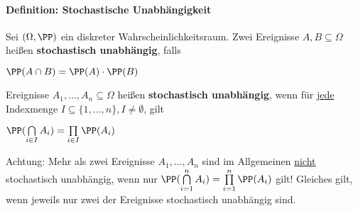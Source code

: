 \paragraph{Definition: Stochastische Unabhängigkeit}\label{independant}
Sei $(\Omega,\PP)$ ein diskreter Wahrscheinlichkeitsraum. 
Zwei Ereignisse $A,B\subseteq\Omega$ heißen \textbf{stochastisch unabhängig}, falls
\begin{tightcenter}
	$\PP(A\cap B)=\PP(A)\cdot\PP(B)$
\end{tightcenter}
\newpage
Ereignisse $A_1,\ldots,A_n\subseteq\Omega$ heißen \textbf{stochastisch unabhängig}, wenn für \underline{jede} Indexmenge $I\subseteq\{1,\ldots,n\},I\neq\emptyset$, gilt
\begin{tightcenter}
	$\PP(\bigcap\limits_{i\in I}A_i)=\prod\limits_{i\in I}\PP(A_i)$
\end{tightcenter}
Achtung: Mehr als zwei Ereignisse $A_1,\ldots,A_n$ sind im Allgemeinen \underline{nicht} stochastisch unabhängig, wenn nur $\PP(\bigcap\limits_{i=1}^{n}A_i)=\prod\limits_{i=1}^{n}\PP(A_i)$ gilt!
Gleiches gilt, wenn jeweils nur zwei der Ereignisse stochastisch unabhängig sind.